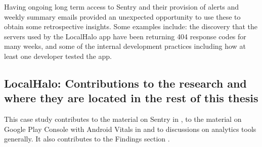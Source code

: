 
Having ongoing long term access to Sentry and their provision of alerts and weekly summary emails provided an unexpected opportunity to use these to obtain some retrospective insights. Some examples include: the discovery that the servers used by the LocalHalo app have been returning 404 response codes for many weeks, and some of the internal development practices including how at least one developer tested the app.


\subsection{LocalHalo: Contributions to the research and where they are located in the rest of this thesis}
This case study contributes to the material on Sentry in , to the material on Google Play Console with Android Vitals in  and to discussions on analytics tools generally. It also contributes to the Findings section .

